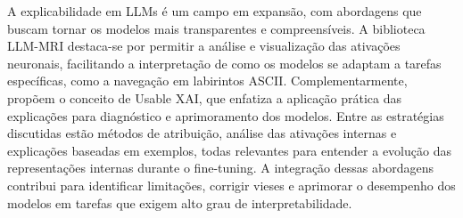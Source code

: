 A explicabilidade em LLMs é um campo em expansão, com abordagens que buscam tornar os modelos mais transparentes e compreensíveis. A biblioteca LLM-MRI \cite{costa2024llmmri} destaca-se por permitir a análise e visualização das ativações neuronais, facilitando a interpretação de como os modelos se adaptam a tarefas específicas, como a navegação em labirintos ASCII. Complementarmente, \cite{wu2025usablexai10strategies} propõem o conceito de Usable XAI, que enfatiza a aplicação prática das explicações para diagnóstico e aprimoramento dos modelos. Entre as estratégias discutidas estão métodos de atribuição, análise das ativações internas e explicações baseadas em exemplos, todas relevantes para entender a evolução das representações internas durante o fine-tuning. A integração dessas abordagens contribui para identificar limitações, corrigir vieses e aprimorar o desempenho dos modelos em tarefas que exigem alto grau de interpretabilidade.